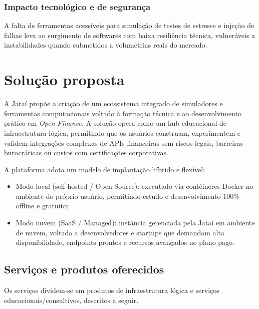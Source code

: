 \documentclass[
  12pt,
  openright,
  oneside,
  a4paper,
  brazilian
]{abntex2}
\newcommand{\openfinance}{\textit{Open Finance}}
\begin{document}
\subsection{Impacto tecnológico e de segurança}
A falta de ferramentas acessíveis para simulação de testes de estresse e injeção de falhas leva ao surgimento de softwares com baixa resiliência técnica, vulneráveis a instabilidades quando submetidos a volumetrias reais do mercado.

\chapter{Solução proposta}
\label{cap:solucao_proposta}

A Jataí propõe a criação de um ecossistema integrado de simuladores e ferramentas computacionais voltado à formação técnica e ao desenvolvimento prático em \openfinance{}. A solução opera como um hub educacional de infraestrutura lógica, permitindo que os usuários construam, experimentem e validem integrações complexas de APIs financeiras sem riscos legais, barreiras burocráticas ou custos com certificações corporativas.

A plataforma adota um modelo de implantação híbrido e flexível:
\begin{itemize}
    \item{Modo local (self-hosted / Open Source):} executado via contêineres Docker no ambiente do próprio usuário, permitindo estudo e desenvolvimento $100\%$ offline e gratuito;
    \item{Modo nuvem (SaaS / Managed):} instância gerenciada pela Jataí em ambiente de nuvem, voltada a desenvolvedores e startups que demandam alta disponibilidade, endpoints prontos e recursos avançados no plano pago.
\end{itemize}

\section{Serviços e produtos oferecidos}
\label{sec:servicos_oferecidos}

Os serviços dividem-se em produtos de infraestrutura lógica e serviços educacionais/consultivos, descritos a seguir.
\end{document}
